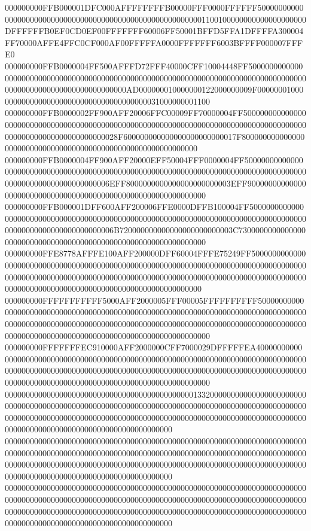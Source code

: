 000000000FFB000001DFC000AFFFFFFFFB00000FFF0000FFFFFF50000000000000000000000000000000000000000000000000000000001100100000000000000000000DFFFFFFB0EF0CD0EF00FFFFFFF60006FF50001BFFD5FFA1DFFFFA300004FF70000AFFE4FFC0CF000AF00FFFFFA0000FFFFFFF6003BFFFF000007FFFE0
000000000FFB0000004FF500AFFFD72FFF40000CFF10004448FF500000000000000000000000000000000000000000000000000000000000000000000000000000000000000000000000000000000000000000AD000000010000000122000000009F000000010000000000000000000000000000000000000031000000001100
000000000FFB0000002FF900AFF20006FFC00009FF70000004FF500000000000000000000000000000000000000000000000000000000000000000000000000000000000000000000000000000000000000028F600000000000000000000000017F8000000000000000000000000000000000000000000000000000000000000
000000000FFB0000004FF900AFF20000EFF50004FFF0000004FF500000000000000000000000000000000000000000000000000000000000000000000000000000000000000000000000000000000000006EFF8000000000000000000000003EFF90000000000000000000000000000000000000000000000000000000000000
000000000FFB000001DFF600AFF200006FFE0000DFFB100004FF500000000000000000000000000000000000000000000000000000000000000000000000000000000000000000000000000000000000006B720000000000000000000000003C7300000000000000000000000000000000000000000000000000000000000000
000000000FFE8778AFFFE100AFF200000DFF60004FFFE75249FF500000000000000000000000000000000000000000000000000000000000000000000000000000000000000000000000000000000000000000000000000000000000000000000000000000000000000000000000000000000000000000000000000000000000
000000000FFFFFFFFFFF5000AFF2000005FFF00005FFFFFFFFFF500000000000000000000000000000000000000000000000000000000000000000000000000000000000000000000000000000000000000000000000000000000000000000000000000000000000000000000000000000000000000000000000000000000000
000000000FFFFFFFEC910000AFF2000000CFF7000029DFFFFFEA400000000000000000000000000000000000000000000000000000000000000000000000000000000000000000000000000000000000000000000000000000000000000000000000000000000000000000000000000000000000000000000000000000000000
0000000000000000000000000000000000000000000001332000000000000000000000000000000000000000000000000000000000000000000000000000000000000000000000000000000000000000000000000000000000000000000000000000000000000000000000000000000000000000000000000000000000000000
0000000000000000000000000000000000000000000000000000000000000000000000000000000000000000000000000000000000000000000000000000000000000000000000000000000000000000000000000000000000000000000000000000000000000000000000000000000000000000000000000000000000000000
0000000000000000000000000000000000000000000000000000000000000000000000000000000000000000000000000000000000000000000000000000000000000000000000000000000000000000000000000000000000000000000000000000000000000000000000000000000000000000000000000000000000000000
